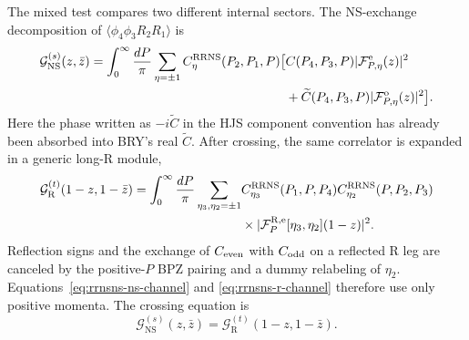 \documentclass[11pt]{article}
\newcommand{\NS}{\mathrm{NS}}
\newcommand{\R}{\mathrm{R}}
\newcommand{\F}{\mathcal F}
\begin{document}
The mixed test compares two different internal sectors.  The NS-exchange
decomposition of $\langle\phi_4\phi_3R_2R_1\rangle$ is
\begin{equation}
 \begin{aligned}
 \mathcal G_{\NS}^{(s)}(z,\bar z)
 =\int_0^\infty \frac{dP}{\pi}\sum_{\eta=\pm1}
 C_{\eta}^{\R\R\NS}(P_2,P_1,P)
 \big[&C(P_4,P_3,P)|\F_{P,\eta}^{\rm e}(z)|^2
 \\
 &+\widetilde C(P_4,P_3,P)
   |\F_{P,\eta}^{\rm o}(z)|^2\big].
 \end{aligned}
 \label{eq:rrnsns-ns-channel}
\end{equation}
Here the phase written as $-i\widetilde C$ in the HJS component convention
has already been absorbed into BRY's real $\widetilde C$.  After crossing,
the same correlator is expanded in a generic long-R module,
\begin{equation}
 \begin{aligned}
 \mathcal G_{\R}^{(t)}(1-z,1-\bar z)
 =\int_0^\infty \frac{dP}{\pi}
 \sum_{\eta_3,\eta_2=\pm1}
 &C_{\eta_3}^{\R\R\NS}(P_1,P,P_4)
  C_{\eta_2}^{\R\R\NS}(P,P_2,P_3)
 \\
 &\times|\F_{P}^{\R,\rm e}
   [\eta_3,\eta_2](1-z)|^2.
 \end{aligned}
 \label{eq:rrnsns-r-channel}
\end{equation}
Reflection signs and the exchange of $C_{\rm even}$ with $C_{\rm odd}$ on
a reflected R leg are canceled by the positive-$P$ BPZ pairing and a dummy
relabeling of $\eta_2$.  Equations~\eqref{eq:rrnsns-ns-channel} and
\eqref{eq:rrnsns-r-channel} therefore use only positive momenta.  The
crossing equation is
\begin{equation}
 \mathcal G_{\NS}^{(s)}(z,\bar z)
 =\mathcal G_{\R}^{(t)}(1-z,1-\bar z).
 \label{eq:rrnsns-crossing}
\end{equation}
\end{document}
